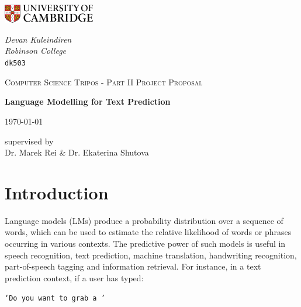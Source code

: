 \documentclass[a4paper, 12pt]{article}
\newcommand{\ttt}[1]{\texttt{#1}}
\begin{document}
\begin{titlepage}
	\noindent
	\begin{minipage}[t][][t]{0.5\textwidth}
		\includegraphics[width=40mm]{./Images/CamLogo.jpg}
	\end{minipage}
	\begin{minipage}{0.5\textwidth}
	\begin{flushright}
		\large
		\textit{Devan Kuleindiren}
		\\
		\textit{Robinson College}
		\\
		\texttt{dk503}
	\end{flushright}
	\end{minipage}
	
	\begin{center}
	\vspace{6cm}
	{\scshape\large Computer Science Tripos - Part II Project Proposal\par}
	\vspace{0.5cm}
	{\huge\bfseries Language Modelling for Text Prediction\par}
	\vspace{0.5cm}
	{\large \today \par}
	\end{center}
	
	\vfill
	
	\begin{center}
	supervised by \\
	Dr. Marek Rei \& Dr. Ekaterina Shutova
	\end{center}
	
	\vspace{1.5cm}
\end{titlepage}

\section*{Introduction}
Language models (LMs) produce a probability distribution over a sequence of words, which can be used to estimate the relative likelihood of words or phrases occurring in various contexts. The predictive power of such models is useful in speech recognition, text prediction, machine translation, handwriting recognition, part-of-speech tagging and information retrieval. For instance, in a text prediction context, if a user has typed:

\begin{center}
	\ttt{`Do you want to grab a '}
\end{center}
\end{document}
